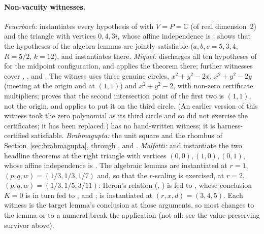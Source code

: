 \documentclass[11pt]{article}
\theoremstyle{definition}
\theoremstyle{remark}
\newcommand{\CC}{\mathbb{C}}
\begin{document}
\paragraph{Non-vacuity witnesses.} \emph{Feuerbach:} 
instantiates every hypothesis of  with $V=P=\CC$ (of real dimension~2)
and the triangle  with vertices $0,4,3i$, whose affine independence is
;  shows that the
hypotheses of the algebra lemmas are jointly satisfiable ($a,b,c=5,3,4$, $R=5/2$, $k=12$), and
 instantiates  there.
\emph{Miquel:}  discharges all ten hypotheses of
 for the midpoint configuration, and 
applies the theorem there; further witnesses cover ,
,  and . The 
witness  uses three genuine circles, $x^2+y^2-2x$, $x^2+y^2-2y$ (meeting
at the origin and at $(1,1)$) and $x^2+y^2-2$, with non-zero certificate multipliers;
 proves that the second intersection point of the first two is
$(1,1)$, not the origin, and  applies  to put
it on the third circle. (An earlier version of this witness took the zero polynomial as its third
circle and so did not exercise the certificates; it has been replaced.)  has
no hand-written witness; it is harness-certified satisfiable.
\emph{Brahmagupta:} the unit square and the rhombus of Section~\ref{sec:brahmagupta}, through
,  and
.
\emph{Malfatti:}  and
 instantiate the two headline theorems at the right
triangle  with vertices $(0,0),(1,0),(0,1)$, whose affine independence is
. The algebraic lemmas are instantiated at $r=1$,
$(p,q,w)=(1/3,1/3,1/7)$ and, so that the $r$-scaling is exercised, at $r=2$,
$(p,q,w)=(1/3,1/5,3/11)$: Heron's relation (,
) is fed to , whose conclusion
$K=0$ is in turn fed to ,  and
;  is instantiated at $(r,x,d)=(3,4,5)$. Each
witness is the target lemma's conclusion at those arguments, so most changes to the lemma or to a
numeral break the application (not all: see the value-preserving survivor above).
\end{document}
